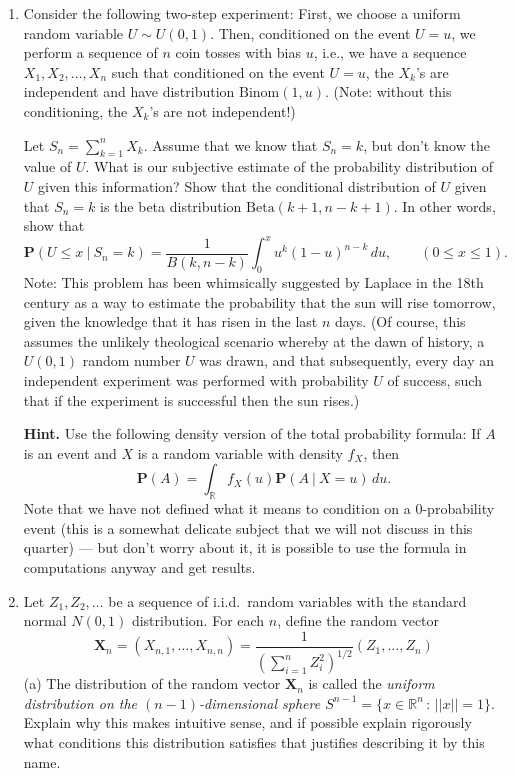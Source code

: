 \documentclass[12pt]{article}
\newcommand{\R}{\mathbb{R}}
\newcommand{\prob}{\mathbf{P}}
\theoremstyle{example}
\begin{document}
\begin{enumerate}
\item Consider the following two-step experiment: First, we choose a uniform random variable $U \sim U(0,1)$. Then, conditioned on the event $U=u$, we perform a sequence of $n$ coin tosses with bias $u$, i.e., we have a sequence $X_1,X_2,\ldots,X_n$ such that conditioned on the event $U=u$, the $X_k$'s are independent and have distribution $\textrm{Binom}(1,u)$. (Note: without this conditioning, the $X_k$'s are not independent!)

Let $S_n = \sum_{k=1}^n X_k$. Assume that we know that $S_n=k$, but don't know the value of $U$. What is our subjective estimate of the probability distribution of $U$ given this information? Show that the conditional distribution of $U$ given that $S_n = k$ is the beta distribution $\textrm{Beta}(k+1,n-k+1)$. In other words, show that
$$ \prob(U \le x\ |\ S_n = k) = \frac{1}{B(k,n-k)} \int_0^x u^k (1-u)^{n-k}\,du, \qquad (0\le x\le 1). $$
Note: This problem has been whimsically suggested by Laplace in the 18th century as a way to estimate the probability that the sun will rise tomorrow, given the knowledge that it has risen in the last $n$ days. (Of course, this assumes the unlikely theological scenario whereby at the dawn of history, a $U(0,1)$ random number $U$ was drawn, and that subsequently, every day an independent experiment was performed with probability $U$ of success, such that if the experiment is successful then the sun rises.)

\medskip\noindent \textbf{Hint.} Use the following density version of the total probability formula: If $A$ is an event and $X$ is a random variable with density $f_X$, then
$$ \prob(A) = \int_{\R} f_X(u) \prob(A\ |\ X=u)\,du. $$
Note that we have not defined what it means to condition on a 0-probability event (this is a somewhat delicate subject that we will not discuss in this quarter) --- but don't worry about it, it is possible to use the formula in computations anyway and get results.


\item Let $Z_1,Z_2,\ldots$ be a sequence of i.i.d.\ random variables with the standard normal $N(0,1)$ distribution. For each $n$, define the random vector
$$ \mathbf{X}_n = (X_{n,1},\ldots,X_{n,n}) = \frac{1}{\left(\sum_{i=1}^n Z_i^2\right)^{1/2}}
(Z_1,\ldots,Z_n)
$$
(a) The distribution of the random vector $\mathbf{X}_n$ is called the \emph{uniform distribution on the $(n-1)$-dimensional sphere $S^{n-1}=\{ x\in \R^n\,:\, ||x||=1 \}$}. Explain why this makes intuitive sense, and if possible explain rigorously what conditions this distribution satisfies that justifies describing it by this name.


\end{enumerate}
\end{document}
